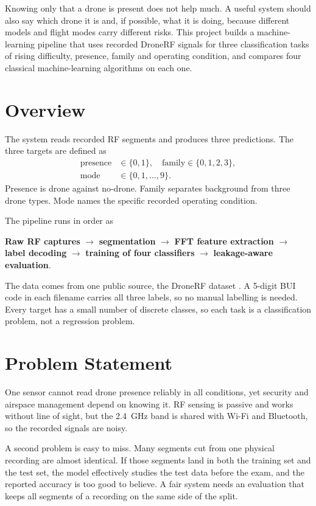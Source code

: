 \documentclass[11pt,conference,a4paper]{IEEEtran}
\begin{document}
Knowing only that a drone is present does not help much. A useful system should
also say which drone it is and, if possible, what it is doing, because different
models and flight modes carry different risks. This project builds a
machine-learning pipeline that uses recorded DroneRF signals for three
classification tasks of rising difficulty, presence, family and operating
condition, and compares four classical machine-learning algorithms on each one.

\section{Overview}
The system reads recorded RF segments and produces three predictions. The three
targets are defined as
\begin{align*}
\text{presence} &\in \{0,1\}, \quad \text{family} \in \{0,1,2,3\},\\
\text{mode} &\in \{0,1,\dots,9\}.
\end{align*}
Presence is drone against no-drone. Family separates background from three drone
types. Mode names the specific recorded operating condition.

The pipeline runs in order as

\noindent\textbf{Raw RF captures} $\rightarrow$ \textbf{segmentation}
$\rightarrow$ \textbf{FFT feature extraction} $\rightarrow$ \textbf{label
decoding} $\rightarrow$ \textbf{training of four classifiers} $\rightarrow$
\textbf{leakage-aware evaluation}.

The data comes from one public source, the DroneRF dataset
\cite{dronerf_dib, alsad_fgcs}. A 5-digit BUI code in each filename carries all
three labels, so no manual labelling is needed. Every target has a small number
of discrete classes, so each task is a classification problem, not a regression
problem.

\section{Problem Statement}
One sensor cannot read drone presence reliably in all conditions, yet security
and airspace management depend on knowing it. RF sensing is passive and works
without line of sight, but the 2.4~GHz band is shared with Wi-Fi and Bluetooth,
so the recorded signals are noisy.

A second problem is easy to miss. Many segments cut from one physical recording
are almost identical. If those segments land in both the training set and the
test set, the model effectively studies the test data before the exam, and the
reported accuracy is too good to believe. A fair system needs an evaluation that
keeps all segments of a recording on the same side of the split.
\end{document}
